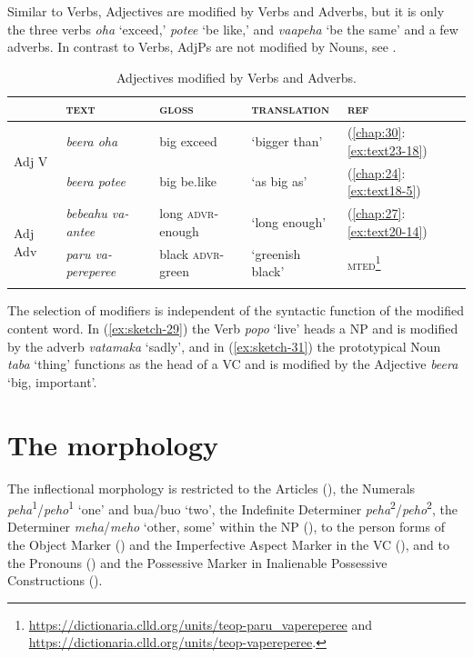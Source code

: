 \documentclass[output=paper]{langscibook}
\begin{document}
Similar to Verbs, Adjectives are modified by Verbs and Adverbs, but it is only the three verbs \textit{oha} `exceed,' \textit{potee} `be like,' and \textit{vaapeha} `be the same' and a few adverbs. In contrast to Verbs, AdjPs are not modified by Nouns, see .


\begin{table}[t]
    \caption{Adjectives modified by Verbs and Adverbs.} \label{tab:adjmod}
\begin{tabularx}{\textwidth}{Xllll}
    \lsptoprule
    &\textsc{text}&\textsc{gloss}&\textsc{translation}&\textsc{ref}\\
    \midrule
        \multirow{2}{*}{Adj V}&\textit{beera oha}&big exceed&`bigger than'&(\ref{chap:30}:\ref{ex:text23-18})\\
        &\textit{beera potee}&big be.like&`as big as'&(\ref{chap:24}:\ref{ex:text18-5})\\\midrule
        \multirow{2}{*}{Adj Adv}&\textit{bebeahu va-antee}&long \textsc{advr}-enough&`long enough'&(\ref{chap:27}:\ref{ex:text20-14})\\
        &\textit{paru va-pereperee}&black \textsc{advr}-green&`greenish black'&\textsc{mted}\footnote{\url{https://dictionaria.clld.org/units/teop-paru_vapereperee} and \url{https://dictionaria.clld.org/units/teop-vapereperee}.}\\
    \lspbottomrule
\end{tabularx}
\end{table}

The selection of modifiers is independent of the syntactic function of the modified content word. In (\ref{ex:sketch-29}) the Verb \textit{popo} `live' heads a NP and is modified by the adverb \textit{vatamaka} `sadly', and in (\ref{ex:sketch-31}) the prototypical Noun \textit{taba} `thing' functions as the head of a VC and is modified by the Adjective \textit{beera} `big, important'.
\section{The morphology}\label{sec:morphology}
The inflectional morphology is restricted to the Articles (), the Numerals \textit{peha}\textsuperscript{1}/\textit{peho}\textsuperscript{1} `one' and bua/buo `two', the Indefinite Determiner \textit{peha}\textsuperscript{2}/\textit{peho}\textsuperscript{2}, the Determiner \textit{meha}/\textit{meho} `other, some' within the NP (), to the person forms of the Object Marker () and the Imperfective Aspect Marker in the VC (), and to the Pronouns () and the Possessive Marker in Inalienable Possessive Constructions ().
\end{document}
